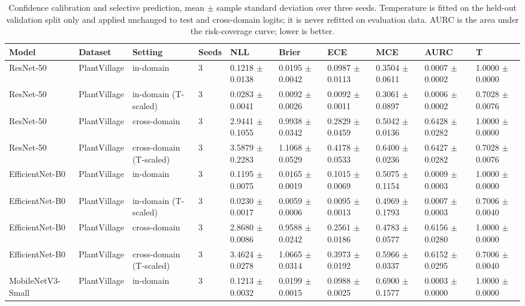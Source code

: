 \begin{table}
\caption{Confidence calibration and selective prediction, mean $\pm$ sample standard deviation over three seeds. Temperature is fitted on the held-out validation split only and applied unchanged to test and cross-domain logits; it is never refitted on evaluation data. AURC is the area under the risk-coverage curve; lower is better.}
\label{tab:calibration}
\centering
\setlength{\tabcolsep}{2pt}
\begin{tabular}{llllllllll}
\toprule
Model & Dataset & Setting & Seeds & NLL & Brier & ECE & MCE & AURC & T \\
\midrule
ResNet-50 & PlantVillage & in-domain & 3 & 0.1218 $\pm$ 0.0138 & 0.0195 $\pm$ 0.0042 & 0.0987 $\pm$ 0.0113 & 0.3504 $\pm$ 0.0611 & 0.0007 $\pm$ 0.0002 & 1.0000 $\pm$ 0.0000 \\
ResNet-50 & PlantVillage & in-domain (T-scaled) & 3 & 0.0283 $\pm$ 0.0041 & 0.0092 $\pm$ 0.0026 & 0.0092 $\pm$ 0.0011 & 0.3061 $\pm$ 0.0897 & 0.0006 $\pm$ 0.0002 & 0.7028 $\pm$ 0.0076 \\
ResNet-50 & PlantVillage & cross-domain & 3 & 2.9441 $\pm$ 0.1055 & 0.9938 $\pm$ 0.0342 & 0.2829 $\pm$ 0.0459 & 0.5042 $\pm$ 0.0136 & 0.6428 $\pm$ 0.0282 & 1.0000 $\pm$ 0.0000 \\
ResNet-50 & PlantVillage & cross-domain (T-scaled) & 3 & 3.5879 $\pm$ 0.2283 & 1.1068 $\pm$ 0.0529 & 0.4178 $\pm$ 0.0533 & 0.6400 $\pm$ 0.0236 & 0.6427 $\pm$ 0.0282 & 0.7028 $\pm$ 0.0076 \\
EfficientNet-B0 & PlantVillage & in-domain & 3 & 0.1195 $\pm$ 0.0075 & 0.0165 $\pm$ 0.0019 & 0.1015 $\pm$ 0.0069 & 0.5075 $\pm$ 0.1154 & 0.0009 $\pm$ 0.0003 & 1.0000 $\pm$ 0.0000 \\
EfficientNet-B0 & PlantVillage & in-domain (T-scaled) & 3 & 0.0230 $\pm$ 0.0017 & 0.0059 $\pm$ 0.0006 & 0.0095 $\pm$ 0.0013 & 0.4969 $\pm$ 0.1793 & 0.0007 $\pm$ 0.0003 & 0.7006 $\pm$ 0.0040 \\
EfficientNet-B0 & PlantVillage & cross-domain & 3 & 2.8680 $\pm$ 0.0086 & 0.9588 $\pm$ 0.0242 & 0.2561 $\pm$ 0.0186 & 0.4783 $\pm$ 0.0577 & 0.6156 $\pm$ 0.0280 & 1.0000 $\pm$ 0.0000 \\
EfficientNet-B0 & PlantVillage & cross-domain (T-scaled) & 3 & 3.4624 $\pm$ 0.0278 & 1.0665 $\pm$ 0.0314 & 0.3973 $\pm$ 0.0192 & 0.5966 $\pm$ 0.0337 & 0.6152 $\pm$ 0.0295 & 0.7006 $\pm$ 0.0040 \\
MobileNetV3-Small & PlantVillage & in-domain & 3 & 0.1213 $\pm$ 0.0032 & 0.0199 $\pm$ 0.0015 & 0.0988 $\pm$ 0.0025 & 0.6900 $\pm$ 0.1577 & 0.0003 $\pm$ 0.0000 & 1.0000 $\pm$ 0.0000 \\

\end{tabular}
\end{table}
